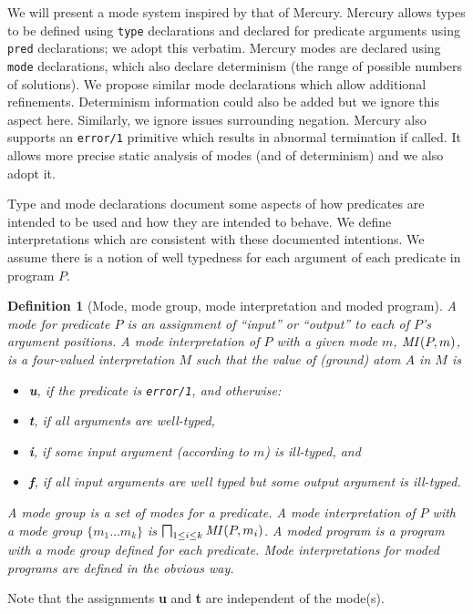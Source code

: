 \documentclass{tlp}
\newtheorem{definition}{Definition}
\newcommand{\ident}[1]{\mbox{\textit{#1}}}
\begin{document}
We will present a mode system inspired by that of Mercury.  Mercury
allows types to be defined using \texttt{type} declarations and
declared for predicate arguments using \texttt{pred} declarations; we
adopt this verbatim.  Mercury modes are declared using \texttt{mode}
declarations, which also declare determinism (the range of possible
numbers of solutions).  We propose similar mode declarations which allow
additional refinements.  Determinism information could also be added
but we ignore this aspect here.  Similarly, we ignore issues surrounding
negation.  Mercury also supports an
\texttt{error/1} primitive which results in abnormal termination if
called.  It allows more precise static analysis of modes 
(and of determinism) and we also adopt it.




Type and mode declarations document some aspects of how predicates are
intended to be used and how they are intended to behave.  We define
interpretations which are consistent with these documented intentions.
We assume there is a notion of well typedness for each argument of each
predicate in program $P$.  


\begin{definition}[Mode, mode group, mode interpretation and moded
program] \rm
A \emph{mode} for predicate $P$ is an assignment of ``input'' or 
``output'' to each of $P$'s argument positions.
A \emph{mode interpretation} of $P$ with a given mode $m$, 
$\ident{MI}(P, m)$, is a four-valued interpretation $M$
such that the value of (ground) atom $A$ in $M$ is
\begin{itemize}
\item
\textbf{u}, if the predicate is \texttt{error/1}, and otherwise:
\item
\textbf{t}, if all arguments are well-typed,
\item
\textbf{i}, if some input argument (according to $m$) is ill-typed, and
\item
\textbf{f}, if all input arguments are well typed but some output
argument is ill-typed.
\end{itemize}
A \emph{mode group} is a set of modes for a predicate.  A \emph{mode
interpretation} of $P$ with a mode group $\{m_1 \ldots m_k\}$ is
$\bigsqcap_{1 \leq i \leq k} \ident{MI}(P, m_i)$.  A \emph{moded program}
is a program with a mode group defined for each predicate.  Mode
interpretations for moded programs are defined in the obvious way.
\end{definition}

Note that the assignments \textbf{u} and \textbf{t} are independent 
of the mode(s).
\end{document}
